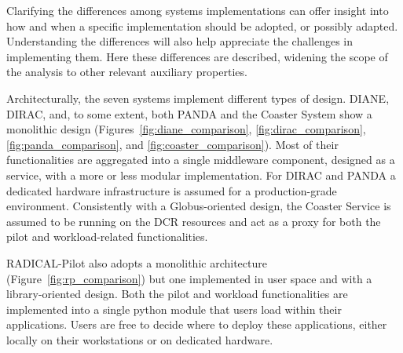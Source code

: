 \documentclass{sig-alternate}
\begin{document}

Clarifying the differences among \pilot systems implementations can offer
insight into how and when a specific implementation should be adopted, or
possibly adapted. Understanding the differences will also help appreciate the
challenges in implementing them.  Here these differences are described, widening
the scope of the analysis to other relevant auxiliary properties.







Architecturally, the seven \pilot systems implement different types of design.
DIANE, DIRAC, and, to some extent, both PANDA and the Coaster System show a
monolithic design (Figures~\ref{fig:diane_comparison},
\ref{fig:dirac_comparison}, \ref{fig:panda_comparison}, and
\ref{fig:coaster_comparison}). Most of their functionalities are aggregated into
a single middleware component, designed as a service, with a more or less
modular implementation. For DIRAC and PANDA a dedicated hardware infrastructure
is assumed for a production-grade environment. Consistently with a
Globus-oriented design, the Coaster Service is assumed to be running on the DCR
resources and act as a proxy for both the pilot and workload-related
functionalities.

RADICAL-Pilot also adopts a monolithic architecture
(Figure~\ref{fig:rp_comparison}) but one implemented in user space and with a
library-oriented design. Both the pilot and workload functionalities are
implemented into a single python module that users load within their
applications. Users are free to decide where to deploy these applications,
either locally on their workstations or on dedicated hardware.
\end{document}
